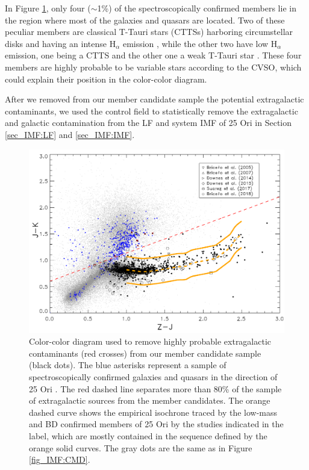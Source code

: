 \documentclass[12pt]{article}
\begin{document}
In Figure \ref{fig_IMF:CCD}, only four ($\sim$1\%) of the spectroscopically confirmed members lie in the region where most of the galaxies and quasars are located. Two of these peculiar members are classical T-Tauri stars (\ac{CTTS}s) harboring circumstellar disks and having an intense H$_\alpha$ emission \citep[41 and 53 \AA; ][]{Suarez2017}, while the other two have low H$_\alpha$ emission, one being a CTTS and the other one a weak T-Tauri star \citep[\ac{WTTS}; ][]{Briceno2007}. These four members are highly probable to be variable stars according to the CVSO, which could explain their position in the color-color diagram.

After we removed from our member candidate sample the potential extragalactic contaminants, we used the control field to statistically remove the extragalactic and galactic contamination from the LF and system IMF of 25 Ori in Section \ref{sec_IMF:LF} and \ref{sec_IMF:IMF}.

\begin{figure}[ht!]
	\includegraphics[width=1.00\textwidth]{f_4.pdf}
	\caption[$J-K$ vs $Z-J$ diagram to remove potential extragalactic sources in our candidate sample.]{Color-color diagram used to remove highly probable extragalactic contaminants (red crosses) from our member candidate sample (black dots). The blue asterisks represent a sample of spectroscopically confirmed galaxies and quasars in the direction of 25 Ori \citep{Suarez2017}. The red dashed line separates more than 80\% of the sample of extragalactic sources from the member candidates. The orange dashed curve shows the empirical isochrone traced by the low-mass and BD confirmed members of 25 Ori by the studies indicated in the label, which are mostly contained in the sequence defined by the orange solid curves. The gray dots are the same as in Figure \ref{fig_IMF:CMD}.}
	\label{fig_IMF:CCD}
\end{figure}
\end{document}
